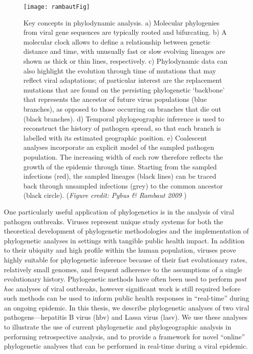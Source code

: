 \begin{figure}[ht]
  \centering
  \medskip
  \texttt{[image: rambautFig]}
  \caption[Applications of phylogenetic analysis]{Key concepts in phylodynamic analysis.
  a) Molecular phylogenies from viral gene sequences are typically rooted and bifurcating.
  b) A molecular clock allows to define a relationship between genetic distance and time, with unusually fast or slow evolving lineages are shown as thick or thin lines, respectively.
  c) Phylodynamic data can also highlight the evolution through time of mutations that may reflect viral adaptations; of particular interest are the replacement mutations that are found on the persisting phylogenetic ‘backbone’ that represents the ancestor of future virus populations (blue branches), as opposed to those occurring on branches that die out (black branches).
  d) Temporal phylogeographic inference is used to reconstruct the history of pathogen spread, so that each branch is labelled with its estimated geographic position.
  e) Coalescent analyses incorporate an explicit model of the sampled pathogen population.
  The increasing width of each row therefore reflects the growth of the epidemic through time. Starting from the sampled infections (red), the sampled lineages (black lines) can be traced back through unsampled infections (grey) to the common ancestor (black circle).
  (\textit{Figure credit: Pybus \& Rambaut 2009} \cite{pybus2009evolutionary})
  }
  \label{fig:phylogeneticsOverview}
\end{figure}


One particularly useful application of phylogenetics is in the analysis of viral pathogen outbreaks.
Viruses represent unique study systems for both the theoretical development of phylogenetic methodologies and the implementation of phylogenetic analyses in settings with tangible public health impact.
In addition to their ubiquity and high profile within the human population, viruses prove highly suitable for phylogenetic inference because of their fast evolutionary rates, relatively small genomes, and frequent adherence to the assumptions of a single evolutionary history.
Phylogenetic methods have often been used to perform \textit{post hoc} analyses of viral outbreaks, however significant work is still required before such methods can be used to inform public health responses in ``real-time'' during an ongoing epidemic.
In this thesis, we describe phylogenetic analyses of two viral pathogens---hepatitis B virus (\gls{hbv}) and Lassa virus (\gls{lasv}).
We use these analyses to illustrate the use of current phylogenetic and phylogeographic analysis in performing retrospective analysis, and to provide a framework for novel ``online'' phylogenetic analyses that can be performed in real-time during a viral epidemic.

